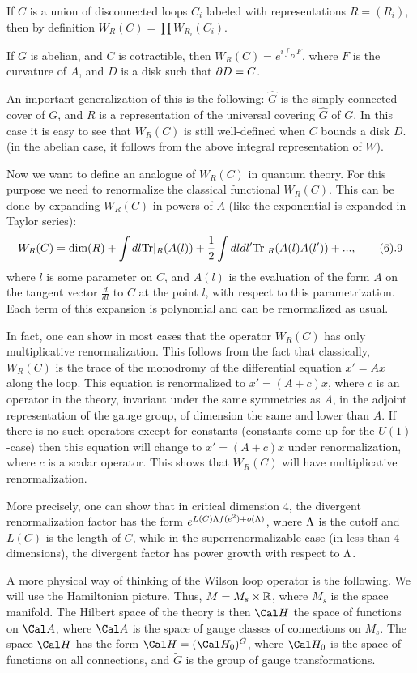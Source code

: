 If $C$ is a union of disconnected loops $C_i$ labeled with representations
$R=(R_i)$, then by definition $W_R(C)=\prod W_{R_i}(C_i)$. 

If $G$ is abelian, and $C$ is cotractible, then 
$W_R(C)=e^{i\int_D F}$, where $F$ is the curvature of $A$, and 
$D$ is a disk such that $\partial D=C$. 

An important generalization of this is the following: 
$\hat G$ is the simply-connected cover of $G$, and $R$ is 
a representation of the universal covering 
$\hat G$ of $G$. In this case it is easy to see that 
$W_R(C)$ is still well-defined when $C$ bounds a disk $D$. 
(in the abelian case, it follows from the above integral representation
of $W$). 

Now we want to define an analogue of $W_R(C)$ in quantum theory. 
For this purpose we need to renormalize the classical functional
$W_R(C)$. This can be done by expanding $W_R(C)$ in powers of $A$ 
(like the exponential is expanded in Taylor series):
$$
W_R(C)=\text{dim}(R)+\int dl\Tr|_R(A(l))+
\frac{1}{2}\int dl dl'\Tr|_R(A(l)A(l'))+...,\tag 6.9
$$
where $l$ is some parameter on $C$, and 
$A(l)$ is the evaluation of the form $A$ on the 
tangent vector $\frac{d}{dl}$ to $C$ at the point $l$, with respect to this 
parametrization. Each term of this expansion
is polynomial and can be renormalized as usual. 

In fact, one can show in most cases that 
the operator $W_R(C)$ has only multiplicative renormalization. 
This follows from the fact that classically, 
$W_R(C)$ is the trace of the monodromy of the differential equation
$x'=Ax$ along the loop. This equation is renormalized to
$x'=(A+c)x$, where $c$ is an operator in the theory, invariant
under the same symmetries as $A$, in the adjoint representation of 
the gauge group, of dimension the same and lower than $A$. If there is
no such operators except for constants 
(constants come up for the $U(1)$-case)
then this equation will change to $x'=(A+c)x$ under 
renormalization, where $c$ is a scalar operator. This shows that $W_R(C)$ 
will have multiplicative renormalization. 

More precisely, one can show 
that in critical dimension 4, the divergent renormalization 
factor has the form $e^{L(C)\Lambda f(e^2)+o(\Lambda)}$, 
where $\Lambda$ is the cutoff and $L(C)$ is the length of $C$, while 
in the superrenormalizable case (in less than 4 dimensions), 
the divergent factor has power growth with respect to $\Lambda$.

A more physical way of thinking of the Wilson loop operator 
is the following. We will use the Hamiltonian picture. 
Thus, $M=M_s\times \Bbb R$, where $M_s$ is the space manifold.
The Hilbert space of the theory is then $\Cal H$ the space of functions on 
$\Cal A$, where 
$\Cal A$ is the space of gauge classes of connections on
$M_s$. The space $\Cal H$ has the form $\Cal H=(\Cal H_0)^{\tilde G}$, 
where $\Cal H_0$ is the space of functions on all connections, 
and $\tilde G$ is the group of  gauge transformations.
 
